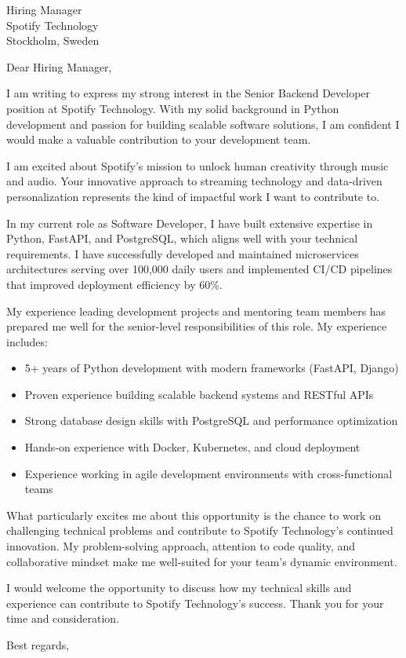 \documentclass[11pt,a4paper]{letter}
\begin{document}
\begin{letter}{Hiring Manager \\ Spotify Technology \\ Stockholm, Sweden}

\opening{Dear Hiring Manager,}

I am writing to express my strong interest in the Senior Backend Developer position at Spotify Technology. With my solid background in Python development and passion for building scalable software solutions, I am confident I would make a valuable contribution to your development team.

I am excited about Spotify's mission to unlock human creativity through music and audio. Your innovative approach to streaming technology and data-driven personalization represents the kind of impactful work I want to contribute to.

In my current role as Software Developer, I have built extensive expertise in Python, FastAPI, and PostgreSQL, which aligns well with your technical requirements. I have successfully developed and maintained microservices architectures serving over 100,000 daily users and implemented CI/CD pipelines that improved deployment efficiency by 60\%.

My experience leading development projects and mentoring team members has prepared me well for the senior-level responsibilities of this role. My experience includes:

\begin{itemize}
\item 5+ years of Python development with modern frameworks (FastAPI, Django)
\item Proven experience building scalable backend systems and RESTful APIs
\item Strong database design skills with PostgreSQL and performance optimization
\item Hands-on experience with Docker, Kubernetes, and cloud deployment
\item Experience working in agile development environments with cross-functional teams
\end{itemize}

What particularly excites me about this opportunity is the chance to work on challenging technical problems and contribute to Spotify Technology's continued innovation. My problem-solving approach, attention to code quality, and collaborative mindset make me well-suited for your team's dynamic environment.

I would welcome the opportunity to discuss how my technical skills and experience can contribute to Spotify Technology's success. Thank you for your time and consideration.

\closing{Best regards,}

\end{letter}
\end{document}
